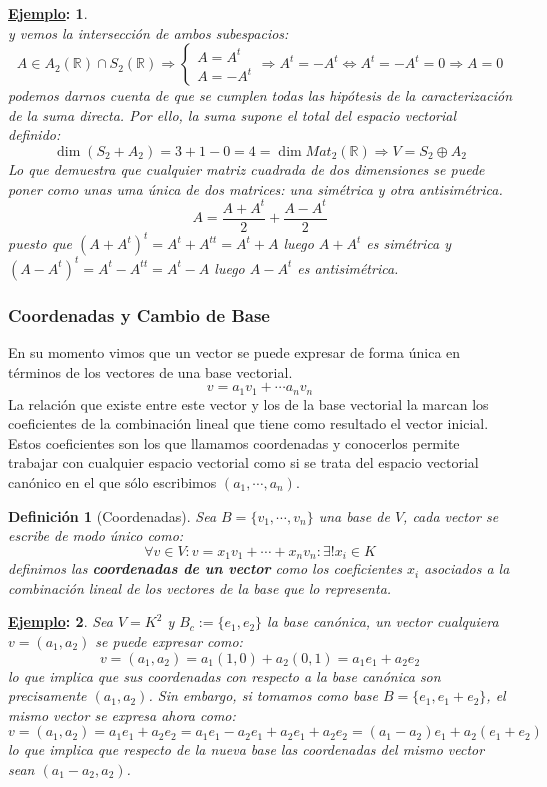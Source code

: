 \documentclass[10pt,a4paper,openright]{book}
\theoremstyle{break}
\newtheorem*{defi}{Definición}
\newtheorem*{ej}{\underline{Ejemplo}:}
\begin{document}
\begin{ej}
$$$$
y vemos la intersección de ambos subespacios:
$$
A\in A_2(\mathbb R)\cap S_2(\mathbb R)\Rightarrow \begin{cases}
A=A^t \\ A=-A^t \end{cases} \Rightarrow A^t=-A^t\Leftrightarrow A^t=-A^t=0\Rightarrow A = 0
$$
podemos darnos cuenta de que se cumplen todas las hipótesis de la caracterización de la suma directa. Por ello, la suma supone el total del espacio vectorial definido:
$$
\dim (S_2+A_2)=3+1-0=4=\dim Mat_2(\mathbb R)\Rightarrow V=S_2\oplus A_2
$$
Lo que demuestra que cualquier matriz cuadrada de dos dimensiones se puede poner como unas uma única de dos matrices: una simétrica y otra antisimétrica.
$$
A = \frac{A + A^t}{2} + \frac{A - A^t}{2}
$$
puesto que $(A+A^t)^t=A^t+A^{tt}=A^t+A$ luego $A+A^t$ es simétrica y $(A-A^t)^t=A^t-A^{tt}=A^t-A$ luego $A-A^t$ es antisimétrica.
\end{ej}

\subsubsection{Coordenadas y Cambio de Base}
En su momento vimos que un vector se puede expresar de forma única en términos de los vectores de una base vectorial.
$$
v = a_1v_1 + \cdots a_nv_n
$$
La relación que existe entre este vector y los de la base vectorial la marcan los coeficientes de la combinación lineal que tiene como resultado el vector inicial. Estos coeficientes son los que llamamos coordenadas y conocerlos permite trabajar con cualquier espacio vectorial como si se trata del espacio vectorial canónico en el que sólo escribimos $(a_1, \cdots, a_n)$.

\begin{defi}[Coordenadas]
Sea $B=\{v_1,\cdots,v_n\}$ una base de $V$, cada vector se escribe de modo único como:
$$
\forall v \in V : v = x_1v_1 + \cdots + x_nv_n: \exists! x_i\in K
$$
definimos las \textbf{coordenadas de un vector} como los coeficientes $x_i$ asociados a la combinación lineal de los vectores de la base que lo representa.
\end{defi}

\begin{ej}
Sea $V=K^2$ y $B_c := \{e_1, e_2\}$ la base canónica, un vector cualquiera $v=(a_1,a_2)$ se puede expresar como:
$$
v=(a_1,a_2) = a_1(1,0) + a_2(0,1) = a_1e_1 + a_2e_2
$$
lo que implica que sus coordenadas con respecto a la base canónica son precisamente $(a_1, a_2)$. Sin embargo, si tomamos como base $B=\{e_1, e_1+e_2\}$, el mismo vector se expresa ahora como:
$$
v=(a_1, a_2) = a_1e_1 + a_2e_2 = a_1e_1 - a_2e_1 + a_2e_1 + a_2e_2 = (a_1 - a_2)e_1 + a_2(e_1 + e_2)
$$
lo que implica que respecto de la nueva base las coordenadas del mismo vector sean $(a_1-a_2, a_2)$.
\end{ej}
\end{document}
